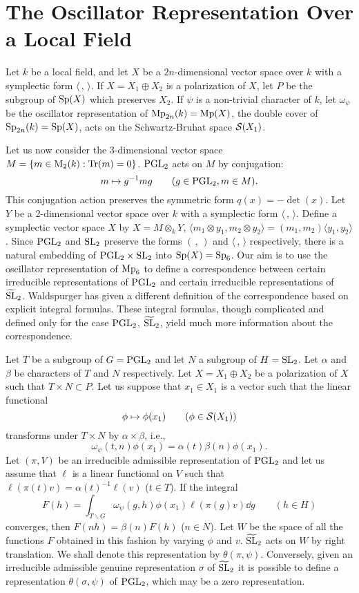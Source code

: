 \section{The Oscillator Representation Over a Local Field}
\label{sec:2}

Let $k$ be a local field, and let $X$ be a $2n$-dimensional vector space over $k$ with a symplectic form $\langle\,,\,\rangle$.
If $X = X_1 \oplus X_2$ is a polarization of $X$, let $P$ be the subgroup of $\mathrm{Sp}(X)$ which preserves $X_2$.
If $\psi$ is a non-trivial character of $k$, let $\omega_\psi$ be the oscillator representation of $\mathrm{Mp}_{2n}(k) = \mathrm{Mp}(X)$, the double cover of $\mathrm{Sp}_{2n}(k) = \mathrm{Sp}(X)$, acts on the Schwartz-Bruhat space $\mathcal{S}(X_1)$.

Let us now consider the 3-dimensional vector space $M = \{m \in \mathrm{M}_2(k): \operatorname*{Tr}(m) = 0\}$.
$\mathrm{PGL}_2$ acts on $M$ by conjugation:
\[
m \mapsto g^{-1} m g \qquad(g \in \mathrm{PGL}_2, m \in M).
\]
This conjugation action preserves the symmetric form $q(x) = -\det(x)$.
Let $Y$ be a 2-dimensional vector space over $k$ with a symplectic form $\langle\,,\,\rangle$.
Define a symplectic vector space $X$ by $X = M \otimes_k Y$,
$\langle m_1 \otimes y_1, m_2 \otimes y_2\rangle = (m_1, m_2) \langle y_1, y_2 \rangle$.
Since $\mathrm{PGL}_2$ and $\mathrm{SL}_2$ preserve
the forms $(\,,\,)$ and $\langle\,,\,\rangle$ respectively, there is a natural embedding of $\mathrm{PGL}_2 \times \mathrm{SL}_2$ into $\mathrm{Sp}(X) = \mathrm{Sp}_6$.
Our aim is to use the oscillator representation of $\mathrm{Mp}_6$ to define a correspondence between certain irreducible representations of $\mathrm{PGL}_2$ and certain irreducible representations of $\widetilde{\mathrm{SL}}_2$.
Waldspurger has given a different definition of the correspondence based on explicit integral formulas.
These integral formulas, though complicated and defined only for the case $\mathrm{PGL}_2$, $\widetilde{\mathrm{SL}}_2$, yield much more information about the correspondence.

Let $T$ be a subgroup of $G = \mathrm{PGL}_2$ and let $N$ a subgroup of $H = \mathrm{SL}_2$.
Let $\alpha$ and $\beta$ be characters of $T$ and $N$ respectively.
Let $X = X_1 \oplus X_2$ be a polarization of $X$ such that $T \times N \subset P$.
Let us suppose that $x_1 \in X_1$ is a vector such that the linear functional
\[
\phi \mapsto \phi(x_1) \qquad (\phi \in \mathcal{S}(X_1))
\]
transforms under $T\times N$ by $\alpha \times \beta$, i.e.,
\[
\omega_\psi(t, n)\phi(x_1) = \alpha(t) \beta(n) \phi(x_1).
\]
Let $(\pi, V)$ be an irreducible admissible representation of $\mathrm{PGL}_2$ and let us assume that $\ell$ is a linear functional on $V$ such that $\ell(\pi(t)v) = \alpha(t)^{-1}\ell(v)$ ($t \in T$).
If the integral
\[
F(h) = \int_{T\backslash G} \omega_\psi(g, h) \phi(x_1) \ell(\pi(g)v)  \dd g \qquad (h \in H)
\]
converges, then $F(nh) = \beta(n)F(h)$ ($n \in N$).
Let $W$ be the space of all the functions $F$ obtained in this fashion by varying $\phi$ and $v$.
$\widetilde{\mathrm{SL}}_2$ acts on $W$ by right translation. We shall denote this representation by $\theta(\pi, \psi)$.
Conversely, given an irreducible admissible genuine representation $\sigma$ of $\widetilde{\mathrm{SL}}_2$ it is possible to define a representation
$\theta(\sigma, \psi)$ of $\mathrm{PGL}_2$, which may be a zero representation.

